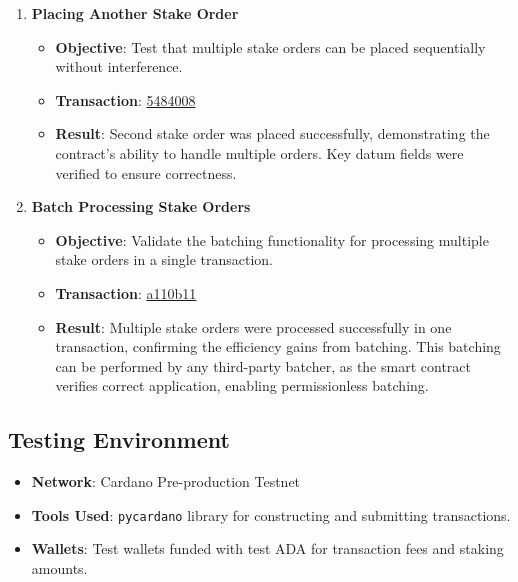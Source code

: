 \documentclass{article}
\begin{document}
\begin{enumerate}
    \item \textbf{Placing Another Stake Order}

    \begin{itemize}
        \item \textbf{Objective}: Test that multiple stake orders can be placed sequentially without interference.
        \item \textbf{Transaction}: \href{https://preprod.cexplorer.io/tx/5484008d76e7525ea9929884d81aa4e744c8a9fd6b03988f602336051076022b}{5484008}
        \item \textbf{Result}: Second stake order was placed successfully, demonstrating the contract's ability to handle multiple orders. Key datum fields were verified to ensure correctness.
    \end{itemize}

    \item \textbf{Batch Processing Stake Orders}

    \begin{itemize}
        \item \textbf{Objective}: Validate the batching functionality for processing multiple stake orders in a single transaction.
        \item \textbf{Transaction}: \href{https://preprod.cexplorer.io/tx/a110b110b803ee05301b961878834ed525afcf60f22767f3df1f74bce1ba09b7}{a110b11}
        \item \textbf{Result}: Multiple stake orders were processed successfully in one transaction, confirming the efficiency gains from batching. This batching can be performed by any third-party batcher, as the smart contract verifies correct application, enabling permissionless batching.
    \end{itemize}
\end{enumerate}

\subsection{Testing Environment}

\begin{itemize}
    \item \textbf{Network}: Cardano Pre-production Testnet
    \item \textbf{Tools Used}: \texttt{pycardano} library for constructing and submitting transactions.
    \item \textbf{Wallets}: Test wallets funded with test ADA for transaction fees and staking amounts.
\end{itemize}
\end{document}
